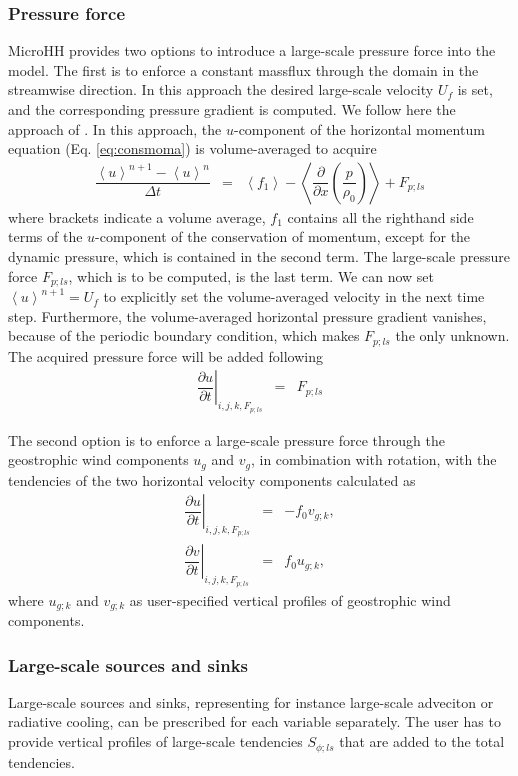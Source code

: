 \documentclass[gmd,manuscript]{copernicus}
\begin{document}
\subsubsection{Pressure force}
MicroHH provides two options to introduce a large-scale pressure force into the model. The first is to enforce a constant massflux through the domain in the streamwise direction. In this approach the desired large-scale velocity $U_f$ is set, and the corresponding pressure gradient is computed. We follow here the approach of  \citet{vanReeuwijk2007}. In this approach, the $u$-component of the horizontal momentum equation (Eq. \ref{eq:consmoma}) is volume-averaged to acquire
\begin{eqnarray}
\dfrac{\left< u \right>^{n+1}  - \left< u \right>^{n}}{\Delta t} & = & \left< f_1 
\right> - \left< \dfrac{\partial}{\partial x} \left( \dfrac{p}{\rho_0} \right) \right>
+ F_{p;ls}
\end{eqnarray}
where brackets indicate a volume average, $f_1$ contains all the righthand side terms of the $u$-component of the conservation of momentum, except for the dynamic pressure, which is contained in the second term. The large-scale pressure force $F_{p;ls}$, which is to be computed, is the last term. We can now set $\left< u \right>^{n+1} = U_f$ to explicitly set the volume-averaged velocity in the next time step. Furthermore, the volume-averaged horizontal pressure gradient vanishes, because of the periodic boundary condition, which makes $F_{p;ls}$ the only unknown. The acquired pressure force will be added following
\begin{eqnarray}
\left. \dfrac{\partial u}{\partial t}\right|_{i,j,k,F_{p;ls}} & = & F_{p;ls}
\end{eqnarray}

The second option is to enforce a large-scale pressure force through the geostrophic wind components $u_g$ and $v_g$, in combination with rotation, with the tendencies of the two horizontal velocity components calculated as
\begin{eqnarray}
\left. \dfrac{\partial u}{\partial t}\right|_{i,j,k,F_{p;ls}} & = & -f_0 v_{g;k},\\
\left. \dfrac{\partial v}{\partial t}\right|_{i,j,k,F_{p;ls}} & = &  f_0 u_{g;k},
\end{eqnarray}
where $u_{g;k}$ and $v_{g;k}$ as user-specified vertical profiles of geostrophic wind components.

\subsubsection{Large-scale sources and sinks}
Large-scale sources and sinks, representing for instance large-scale adveciton or radiative cooling, can be prescribed for each variable separately. The user has to provide vertical profiles of large-scale tendencies $S_{\phi;ls}$ that are added to the total tendencies.
\end{document}
